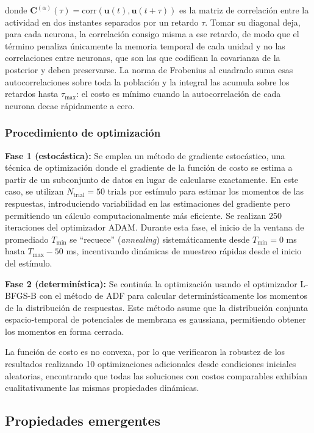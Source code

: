 donde $\mathbf{C}^{(\alpha)}(\tau) = \text{corr}(\mathbf{u}(t), \mathbf{u}(t + \tau))$ es la matriz de correlación entre la actividad en dos instantes separados por un retardo $\tau$. Tomar su diagonal deja, para cada neurona, la correlación consigo misma a ese retardo, de modo que el término penaliza únicamente la memoria temporal de cada unidad y no las correlaciones entre neuronas, que son las que codifican la covarianza de la posterior y deben preservarse. La norma de Frobenius al cuadrado suma esas autocorrelaciones sobre toda la población y la integral las acumula sobre los retardos hasta $\tau_{\max}$: el costo es mínimo cuando la autocorrelación de cada neurona decae rápidamente a cero.

\subsubsection{Procedimiento de optimización}

\textbf{Fase 1 (estocástica):} Se emplea un método de gradiente estocástico, una técnica de optimización donde el gradiente de la función de costo se estima a partir de un subconjunto de datos en lugar de calcularse exactamente. En este caso, se utilizan $N_{\text{trial}} = 50$ trials por estímulo para estimar los momentos de las respuestas, introduciendo variabilidad en las estimaciones del gradiente pero permitiendo un cálculo computacionalmente más eficiente. Se realizan 250 iteraciones del optimizador \acrshort{ADAM}. Durante esta fase, el inicio de la ventana de promediado $T_{\min}$ se ``recuece'' (\textit{annealing}) sistemáticamente desde $T_{\min} = 0$ ms hasta $T_{\max} - 50$ ms, incentivando dinámicas de muestreo rápidas desde el inicio del estímulo.

\textbf{Fase 2 (determinística):} Se continúa la optimización usando el optimizador \acrshort{L-BFGS-B} con el método de \acrfull{ADF} para calcular determinísticamente los momentos de la distribución de respuestas. Este método asume que la distribución conjunta espacio-temporal de potenciales de membrana es gaussiana, permitiendo obtener los momentos en forma cerrada.

La función de costo es no convexa, por lo que \citeauthor{echeveste2020cortical} verificaron la robustez de los resultados realizando 10 optimizaciones adicionales desde condiciones iniciales aleatorias, encontrando que todas las soluciones con costos comparables exhibían cualitativamente las mismas propiedades dinámicas.

\subsection{Propiedades emergentes}
\label{subsec:echeveste_propiedades}


